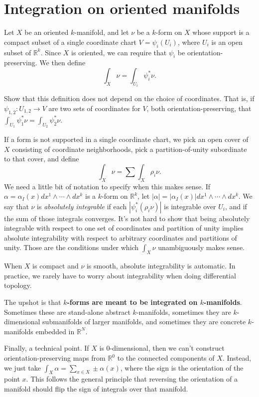 \documentclass[12pt]{amsbook}
\newcommand{\be}{\begin{equation}}
\newcommand{\ee}{\end{equation}}
\newcommand{\R}{{\mathbb R}}
\theoremstyle{definition}
\begin{document}
\section{Integration on oriented manifolds}

Let $X$ be an oriented $k$-manifold, and let $\nu$ be a $k$-form on 
$X$ whose support is a compact subset of a single coordinate chart
$V=\psi_i(U_i)$, where $U_i$ is an open subset of $\R^k$. 
Since $X$ is oriented, we can require that $\psi_i$ be 
orientation-preserving. We then define
\be \int_X \nu = \int_{U_i} \psi_i^* \nu. \ee

\smallskip

 Show that this definition does not depend on the
choice of coordinates. That is, if $\psi_{1,2}: U_{1,2} \to V$ are two sets
of coordinates for $V$, both orientation-preserving, that 
$\int_{U_1} \psi_1^* \nu = \int_{U_2} \psi_2^* \nu$. 

\smallskip

If a form is not supported in a single coordinate chart, we pick an open 
cover of $X$ consisting of coordinate neighborhoods, pick a partition-of-unity
subordinate to that cover, and define
$$ \int_X \nu = \sum \int_X \rho_i \nu. $$
We need a little bit of notation to specify when this makes sense. If 
$\alpha=\alpha_I(x) dx^1\wedge\cdots\wedge dx^k$ is a $k$-form on $\R^k$, 
let $|\alpha| = |\alpha_I(x)| dx^1\wedge\cdots\wedge dx^k$. 
We say that $\nu$ is {\em absolutely integrable} if each
$|\psi_i^* (\rho_i \nu)|$ is integrable over $U_i$, and if the sum of those
integrals converges. It's not hard to show that being absolutely integrable 
with respect to one set of coordinates and partition of unity implies 
absolute integrability with respect to arbitrary coordinates and partitions 
of unity. Those are the conditions under which $\int_X \nu$ unambiguously makes
sense. 

When $X$ is compact and $\nu$ is smooth, absolute integrability is
automatic. In practice, we rarely have to worry about integrability
when doing differential topology.

The upshot is that {\bf $k$-forms are meant to be integrated on $k$-manifolds}.
Sometimes these are stand-alone abstract $k$-manifolds, sometimes they are
$k$-dimensional submanifolds of larger manifolds, and sometimes they are 
concrete $k$-manifolds embedded in $\R^N$. 

Finally, a technical point. If $X$ is 0-dimensional, then we can't construct
orientation-preserving maps from $\R^0$ to the connected components of $X$. 
Instead, we just take $\int_X \alpha = \sum_{x \in X} \pm \alpha(x)$, where
the sign is the orientation of the point $x$. This follows the general 
principle that reversing the orientation of a manifold should flip the sign
of integrals over that manifold. 
\end{document}
